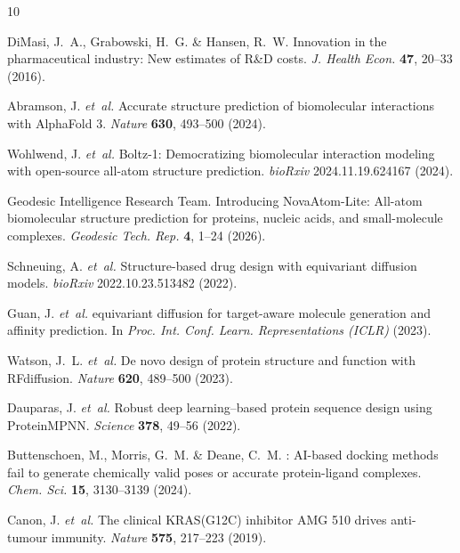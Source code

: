 \documentclass[11pt,a4paper]{article}
\begin{document}
\newpage

\begin{thebibliography}{10}

DiMasi, J.~A., Grabowski, H.~G. \& Hansen, R.~W.
\newblock Innovation in the pharmaceutical industry: New estimates of R\&D costs.
\newblock \emph{J. Health Econ.} \textbf{47}, 20--33 (2016).

Abramson, J. \emph{et~al.}
\newblock Accurate structure prediction of biomolecular interactions with {AlphaFold} 3.
\newblock \emph{Nature} \textbf{630}, 493--500 (2024).

Wohlwend, J. \emph{et~al.}
\newblock Boltz-1: Democratizing biomolecular interaction modeling with open-source all-atom structure prediction.
\newblock \emph{bioRxiv} 2024.11.19.624167 (2024).

{Geodesic Intelligence Research Team}.
\newblock Introducing {NovaAtom-Lite}: All-atom biomolecular structure prediction for proteins, nucleic acids, and small-molecule complexes.
\newblock \emph{Geodesic Tech. Rep.} \textbf{4}, 1--24 (2026).

Schneuing, A. \emph{et~al.}
\newblock Structure-based drug design with equivariant diffusion models.
\newblock \emph{bioRxiv} 2022.10.23.513482 (2022).

Guan, J. \emph{et~al.}
 equivariant diffusion for target-aware molecule generation and affinity prediction.
\newblock In \emph{Proc. Int. Conf. Learn. Representations (ICLR)} (2023).

Watson, J.~L. \emph{et~al.}
\newblock De novo design of protein structure and function with {RFdiffusion}.
\newblock \emph{Nature} \textbf{620}, 489--500 (2023).

Dauparas, J. \emph{et~al.}
\newblock Robust deep learning--based protein sequence design using {ProteinMPNN}.
\newblock \emph{Science} \textbf{378}, 49--56 (2022).

Buttenschoen, M., Morris, G.~M. \& Deane, C.~M.
: AI-based docking methods fail to generate chemically valid poses or accurate protein-ligand complexes.
\newblock \emph{Chem. Sci.} \textbf{15}, 3130--3139 (2024).

Canon, J. \emph{et~al.}
\newblock The clinical {KRAS(G12C)} inhibitor {AMG 510} drives anti-tumour immunity.
\newblock \emph{Nature} \textbf{575}, 217--223 (2019).


\end{thebibliography}
\end{document}
